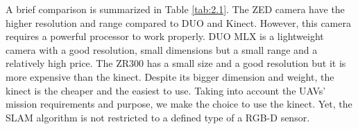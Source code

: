 \documentclass[11pt,openany]{book}
\begin{document}
A brief comparison is summarized in Table \ref{tab:2.1}. The ZED camera have the higher resolution and range compared to DUO and Kinect. However, this camera requires a powerful processor to work properly. DUO MLX is a lightweight camera with a good resolution, small dimensions but a small range and a relatively high price. The ZR300 has a small size and a good resolution but it is more expensive than the kinect. Despite its bigger dimension and weight, the kinect is the cheaper and the easiest to use. Taking into account the UAVs’ mission requirements and purpose, we make the choice to use the kinect. Yet, the SLAM algorithm is not restricted to a deﬁned type of a RGB-D sensor.
\begin{table}[H]
    \caption{RGB-D sensors comparison}
    \label{tab:2.1}
\end{table}
\end{document}
